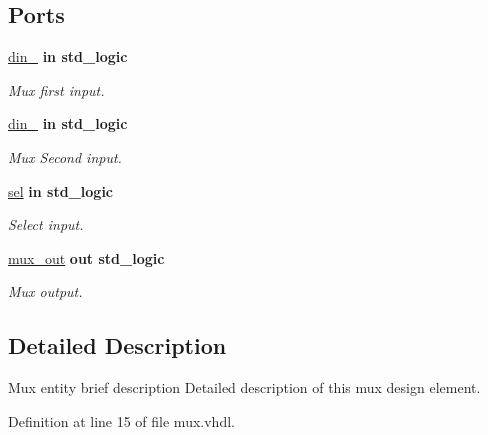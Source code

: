 \subsection*{Ports}
 \begin{DoxyCompactItemize}
\item 
\hyperlink{classmux__using__with_a8d04e56f35c90f337612a9331e852370}{din\+\_}  {\bfseries {\bfseries \textcolor{keywordflow}{in}\textcolor{vhdlchar}{ }}} {\bfseries \textcolor{comment}{std\+\_\+logic}\textcolor{vhdlchar}{ }} 
\begin{DoxyCompactList}\small\item\em Mux first input. \end{DoxyCompactList}\item 
\hyperlink{classmux__using__with_a285845c20ff8bcccff59708069857ad1}{din\+\_}  {\bfseries {\bfseries \textcolor{keywordflow}{in}\textcolor{vhdlchar}{ }}} {\bfseries \textcolor{comment}{std\+\_\+logic}\textcolor{vhdlchar}{ }} 
\begin{DoxyCompactList}\small\item\em Mux Second input. \end{DoxyCompactList}\item 
\hyperlink{classmux__using__with_a1ef41b973fb9b3613d5b1ed10445c395}{sel}  {\bfseries {\bfseries \textcolor{keywordflow}{in}\textcolor{vhdlchar}{ }}} {\bfseries \textcolor{comment}{std\+\_\+logic}\textcolor{vhdlchar}{ }} 
\begin{DoxyCompactList}\small\item\em Select input. \end{DoxyCompactList}\item 
\hyperlink{classmux__using__with_a4702d5a6e2987c3dfd152f7615550900}{mux\+\_\+out}  {\bfseries {\bfseries \textcolor{keywordflow}{out}\textcolor{vhdlchar}{ }}} {\bfseries \textcolor{comment}{std\+\_\+logic}\textcolor{vhdlchar}{ }} 
\begin{DoxyCompactList}\small\item\em Mux output. \end{DoxyCompactList}\end{DoxyCompactItemize}


\subsection{Detailed Description}
Mux entity brief description Detailed description of this mux design element. 

Definition at line 15 of file mux.\+vhdl.



